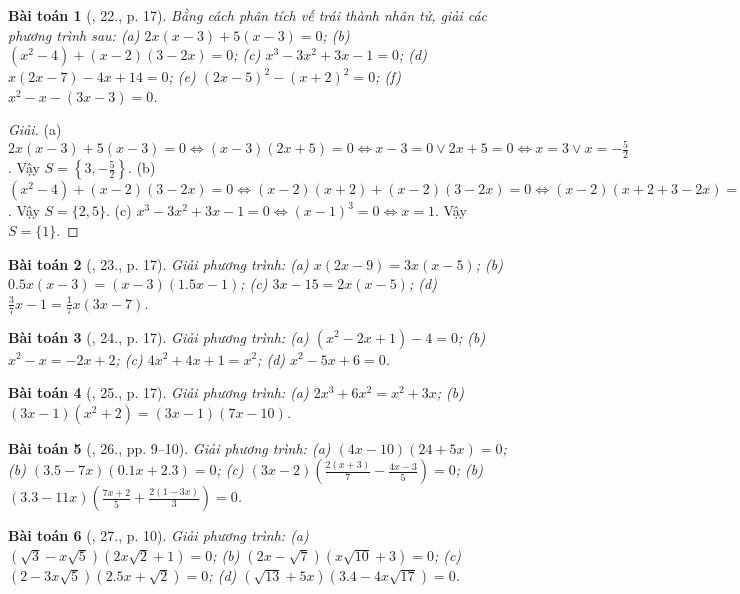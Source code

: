 \documentclass{article}
\newtheorem{baitoan}{Bài toán}
\begin{document}
\begin{baitoan}[\cite{SGK_Toan_8_tap_2}, 22., p. 17]
	Bằng cách phân tích vế trái thành nhân tử, giải các phương trình sau: (a) $2x(x - 3) + 5(x - 3) = 0$; (b) $(x^2 - 4) + (x - 2)(3 - 2x) = 0$; (c) $x^3 - 3x^2 + 3x - 1 = 0$; (d) $x(2x - 7) - 4x + 14 = 0$; (e) $(2x - 5)^2 - (x + 2)^2 = 0$; (f) $x^2 - x - (3x - 3) = 0$.
\end{baitoan}

\begin{proof}[Giải]
	(a) $2x(x - 3) + 5(x - 3) = 0\Leftrightarrow(x - 3)(2x + 5) = 0\Leftrightarrow x - 3 = 0\lor2x + 5 = 0\Leftrightarrow x = 3\lor x = -\frac{5}{2}$. Vậy $S = \left\{3,-\frac{5}{2}\right\}$. (b) $(x^2 - 4) + (x - 2)(3 - 2x) = 0\Leftrightarrow(x - 2)(x + 2) + (x - 2)(3 - 2x) = 0\Leftrightarrow(x - 2)(x + 2 + 3 - 2x) = 0\Leftrightarrow(x - 2)(5 - x) = 0\Leftrightarrow x = 2\lor x = 5$. Vậy $S = \{2,5\}$. (c) $x^3 - 3x^2 + 3x - 1 = 0\Leftrightarrow(x - 1)^3 = 0\Leftrightarrow x = 1$. Vậy $S = \{1\}$.
\end{proof}

\begin{baitoan}[\cite{SGK_Toan_8_tap_2}, 23., p. 17]
	Giải phương trình: (a) $x(2x - 9) = 3x(x - 5)$; (b) $0.5x(x - 3) = (x - 3)(1.5x - 1)$; (c) $3x - 15 = 2x(x - 5)$; (d) $\frac{3}{7}x - 1 = \frac{1}{7}x(3x - 7)$.
\end{baitoan}

\begin{baitoan}[\cite{SGK_Toan_8_tap_2}, 24., p. 17]
	Giải phương trình: (a) $(x^2 - 2x + 1) - 4 = 0$; (b) $x^2 - x = -2x + 2$; (c) $4x^2 + 4x + 1 = x^2$; (d) $x^2 - 5x + 6 = 0$.
\end{baitoan}

\begin{baitoan}[\cite{SGK_Toan_8_tap_2}, 25., p. 17]
	Giải phương trình: (a) $2x^3 + 6x^2 = x^2 + 3x$; (b) $(3x - 1)(x^2 + 2) = (3x - 1)(7x - 10)$.
\end{baitoan}

\begin{baitoan}[\cite{SBT_Toan_8_tap_2}, 26., pp. 9--10]
	Giải phương trình: (a) $(4x - 10)(24 + 5x) = 0$; (b) $(3.5 - 7x)(0.1x + 2.3) = 0$; (c) $(3x - 2)\left(\frac{2(x + 3)}{7} - \frac{4x - 3}{5}\right) = 0$; (b) $(3.3 - 11x)\left(\frac{7x + 2}{5} + \frac{2(1 - 3x)}{3}\right) = 0$.
\end{baitoan}

\begin{baitoan}[\cite{SBT_Toan_8_tap_2}, 27., p. 10]
	Giải phương trình: (a) $(\sqrt{3} - x\sqrt{5})(2x\sqrt{2} + 1) = 0$; (b) $(2x - \sqrt{7})(x\sqrt{10} + 3) = 0$; (c) $(2 - 3x\sqrt{5})(2.5x + \sqrt{2}) = 0$; (d) $(\sqrt{13} + 5x)(3.4 - 4x\sqrt{17}) = 0$.
\end{baitoan}
\end{document}
